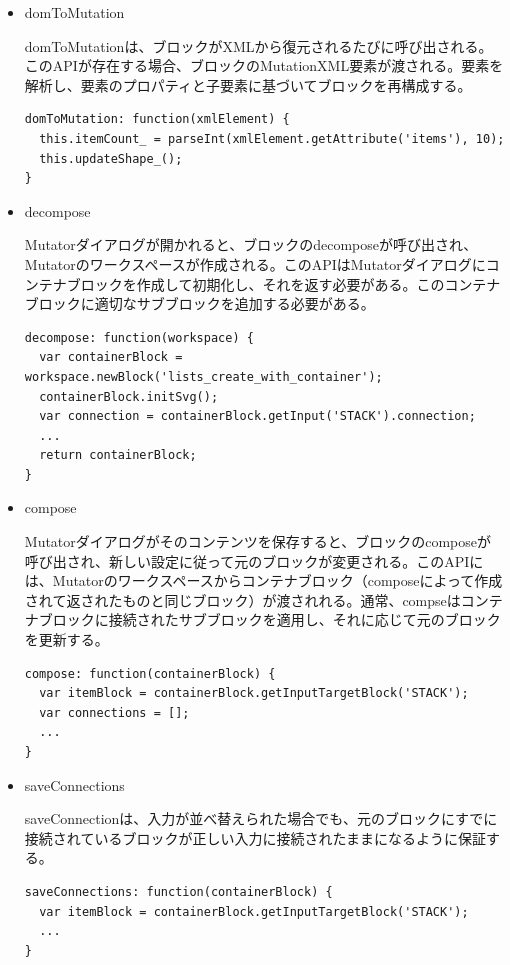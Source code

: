 \documentclass{risepaper}
\begin{document}
\begin{itemize}
\item domToMutation

domToMutationは、ブロックがXMLから復元されるたびに呼び出される。このAPIが存在する場合、ブロックのMutationXML要素が渡される。要素を解析し、要素のプロパティと子要素に基づいてブロックを再構成する。

\begin{lstlisting}[basicstyle=\ttfamily\footnotesize]
domToMutation: function(xmlElement) {
  this.itemCount_ = parseInt(xmlElement.getAttribute('items'), 10);
  this.updateShape_();
}
\end{lstlisting}

\item decompose

Mutatorダイアログが開かれると、ブロックのdecomposeが呼び出され、Mutatorのワークスペースが作成される。このAPIはMutatorダイアログにコンテナブロックを作成して初期化し、それを返す必要がある。このコンテナブロックに適切なサブブロックを追加する必要がある。

\begin{lstlisting}[basicstyle=\ttfamily\footnotesize]
decompose: function(workspace) {
  var containerBlock = workspace.newBlock('lists_create_with_container');
  containerBlock.initSvg();
  var connection = containerBlock.getInput('STACK').connection;
  ...
  return containerBlock;
}
\end{lstlisting}

\item compose

Mutatorダイアログがそのコンテンツを保存すると、ブロックのcomposeが呼び出され、新しい設定に従って元のブロックが変更される。このAPIには、Mutatorのワークスペースからコンテナブロック（composeによって作成されて返されたものと同じブロック）が渡されれる。通常、compseはコンテナブロックに接続されたサブブロックを適用し、それに応じて元のブロックを更新する。

\begin{lstlisting}[basicstyle=\ttfamily\footnotesize]
compose: function(containerBlock) {
  var itemBlock = containerBlock.getInputTargetBlock('STACK');
  var connections = [];
  ...
}
\end{lstlisting}

\item saveConnections

saveConnectionは、入力が並べ替えられた場合でも、元のブロックにすでに接続されているブロックが正しい入力に接続されたままになるように保証する。

\begin{lstlisting}[basicstyle=\ttfamily\footnotesize]
saveConnections: function(containerBlock) {
  var itemBlock = containerBlock.getInputTargetBlock('STACK');
  ...
}
\end{lstlisting}

\end{itemize} 
\end{document}

